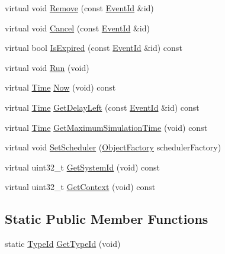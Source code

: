 \begin{DoxyCompactItemize}
\item 
virtual void \hyperlink{classns3_1_1DefaultSimulatorImpl_a31a00b1c740c7c030a7843093e31f43b}{Remove} (const \hyperlink{classns3_1_1EventId}{Event\+Id} \&id)
\item 
virtual void \hyperlink{classns3_1_1DefaultSimulatorImpl_a509aa6ed70ef07e6b6a6999c8e6c6262}{Cancel} (const \hyperlink{classns3_1_1EventId}{Event\+Id} \&id)
\item 
virtual bool \hyperlink{classns3_1_1DefaultSimulatorImpl_a60f3bef198ec0cad109219696592cb21}{Is\+Expired} (const \hyperlink{classns3_1_1EventId}{Event\+Id} \&id) const 
\item 
virtual void \hyperlink{classns3_1_1DefaultSimulatorImpl_a744b5fd2093c8cd507acbff376c41d53}{Run} (void)
\item 
virtual \hyperlink{classns3_1_1Time}{Time} \hyperlink{classns3_1_1DefaultSimulatorImpl_a5d5094d7cc729a517c0720f9403b6a14}{Now} (void) const 
\item 
virtual \hyperlink{classns3_1_1Time}{Time} \hyperlink{classns3_1_1DefaultSimulatorImpl_a4885f4f5abd81a639c7a1bc00bdcfdaa}{Get\+Delay\+Left} (const \hyperlink{classns3_1_1EventId}{Event\+Id} \&id) const 
\item 
virtual \hyperlink{classns3_1_1Time}{Time} \hyperlink{classns3_1_1DefaultSimulatorImpl_aa12267176f85eba24d826c0f991a2ded}{Get\+Maximum\+Simulation\+Time} (void) const 
\item 
virtual void \hyperlink{classns3_1_1DefaultSimulatorImpl_a96241d5a8259aecbd9ad08ccd54c8708}{Set\+Scheduler} (\hyperlink{classns3_1_1ObjectFactory}{Object\+Factory} scheduler\+Factory)
\item 
virtual uint32\+\_\+t \hyperlink{classns3_1_1DefaultSimulatorImpl_af453aa327b330a14f4387d8fb13ccab5}{Get\+System\+Id} (void) const 
\item 
virtual uint32\+\_\+t \hyperlink{classns3_1_1DefaultSimulatorImpl_a616b2bcbb1d12b14515f386ce314093b}{Get\+Context} (void) const 
\end{DoxyCompactItemize}
\subsection*{Static Public Member Functions}
\begin{DoxyCompactItemize}
\item 
static \hyperlink{classns3_1_1TypeId}{Type\+Id} \hyperlink{classns3_1_1DefaultSimulatorImpl_ac9eafae22410ec66b808b6c1e4002127}{Get\+Type\+Id} (void)
\end{DoxyCompactItemize}
